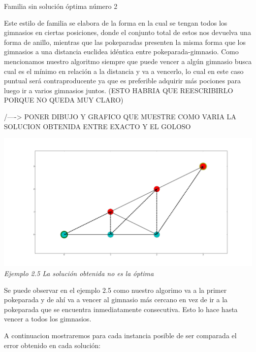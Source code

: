\begin{center}
Familia sin soluci\'on \'optima n\'umero 2
\end{center}

Este estilo de familia se elabora de la forma en la cual se tengan todos los gimnasios en ciertas posiciones, donde el conjunto total de estos nos devuelva una forma de anillo, mientras que las pokeparadas presenten la misma forma que los gimnasios a una distancia euclidea id\'entica entre pokeparada-gimnasio. Como mencionamos nuestro algoritmo siempre que puede vencer a alg\'un gimnasio busca cual es el m\'inimo en relaci\'on a la distancia y va a vencerlo, lo cual en este caso puntual ser\'a contraproducente ya que es preferible adquirir m\'as pociones para luego ir a varios gimnasios juntos. (ESTO HABRIA QUE REESCRIBIRLO PORQUE NO QUEDA MUY CLARO)


/----> PONER DIBUJO Y GRAFICO QUE MUESTRE COMO VARIA LA SOLUCION OBTENIDA ENTRE EXACTO Y EL GOLOSO 

\vspace*{0.3cm} \vspace*{0.3cm}
  \begin{center}
\includegraphics[scale=0.60]{./EJ2/nooptima.jpeg}
\\{\textit{Ejemplo 2.5 La soluci\'on obtenida no es la \'optima}}
  \end{center}
  \vspace*{0.3cm}

Se puede observar en el ejemplo 2.5 como nuestro algorimo va a la primer pokeparada y de ah\'i va a vencer al gimnasio m\'as cercano en vez de ir a la pokeparada que se encuentra inmediatamente consecutiva. Esto lo hace hasta vencer a todos los gimnasios.

A continuacion mostraremos para cada instancia posible de ser comparada el error obtenido en cada soluci\'on:

